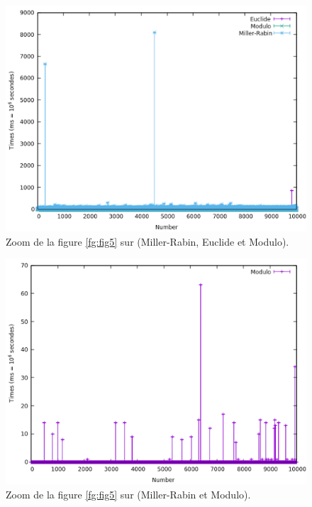 \begin{figure}[!ht]
		\begin{center}\includegraphics[scale=0.6]{RZoom2.png}\end{center}
		\caption{Zoom de la figure \ref{fg:fig5} sur (Miller-Rabin, Euclide et Modulo).}
		\label{fg:fig7}
\end{figure}
\begin{figure}[!ht]
		\begin{center}\includegraphics[scale=0.5]{RZoom4.png}\end{center}
		\caption{Zoom de la figure \ref{fg:fig5} sur (Miller-Rabin et Modulo).}
		\label{fg:fig8}
\end{figure}

